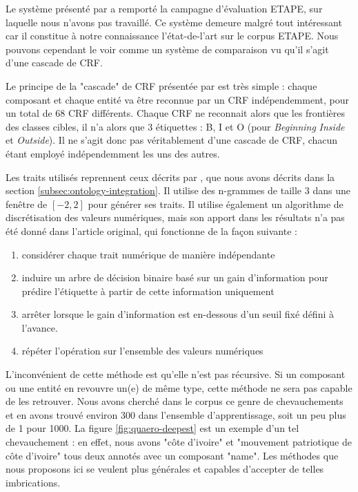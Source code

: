 \documentclass[PhD-Yoann-Dupont.tex]{subfiles}
\begin{document}
Le système présenté par \citet{raymond2013robust} a remporté la campagne d'évaluation ETAPE, sur laquelle nous n'avons pas travaillé. Ce système demeure malgré tout intéressant car il constitue à notre connaissance l'état-de-l'art sur le corpus ETAPE. Nous pouvons cependant le voir comme un système de comparaison vu qu'il s'agit d'une cascade de CRF.

Le principe de la "cascade" de CRF présentée par \citet{raymond2013robust} est très simple : chaque composant et chaque entité va être reconnue par un CRF indépendemment, pour un total de 68 CRF différents. Chaque CRF ne reconnait alors que les frontières des classes cibles, il n'a alors que 3 étiquettes : B, I et O (pour \textit{Beginning} \textit{Inside} et \textit{Outside}). Il ne s'agit donc pas véritablement d'une cascade de CRF, chacun étant employé indépendemment les uns des autres.

Les traits utilisés reprennent ceux décrits par \citet{raymond2010reconnaissance}, que nous avons décrits dans la section \ref{subsec:ontology-integration}. Il utilise des n-grammes de taille 3 dans une fenêtre de $[-2,2]$ pour générer ses traits. Il utilise également un algorithme de discrétisation des valeurs numériques, mais son apport dans les résultats n'a pas été donné dans l'article original, qui fonctionne de la façon suivante :
\begin{enumerate}
    \item considérer chaque trait numérique de manière indépendante %
    \item induire un arbre de décision binaire basé sur un gain d'information pour prédire l'étiquette à partir de cette information uniquement %
    \item arrêter lorsque le gain d'information est en-dessous d'un seuil fixé défini à l'avance. %
    \item répéter l'opération sur l'ensemble des valeurs numériques %
\end{enumerate}

L'inconvénient de cette méthode est qu'elle n'est pas récursive. Si un composant ou une entité en revouvre un(e) de même type, cette méthode ne sera pas capable de les retrouver. Nous avons cherché dans le corpus ce genre de chevauchements et en avons trouvé environ 300 dans l'ensemble d'apprentissage, soit un peu plus de 1 pour 1000. La figure \ref{fig:quaero-deepest} est un exemple d'un tel chevauchement : en effet, nous avons "côte d'ivoire" et "mouvement patriotique de côte d'ivoire" tous deux annotés avec un composant "name". Les méthodes que nous proposons ici se veulent plus générales et capables d'accepter de telles imbrications.
\end{document}
